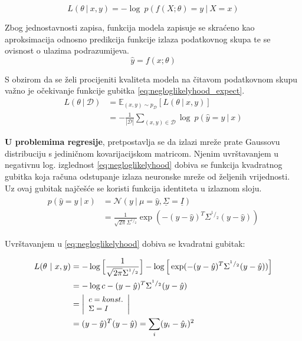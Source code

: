 \documentclass[times, utf8, numeric, diplomski]{fer}
\def\mat#1{\underline{#1}}
\def\expect{\mathbb{E}}
\def\normal{\mathcal{N}}
\def\probsep{\ |\ }
\def\dataset{\mathcal{D}}
\begin{document}
\begin{equation}
\label{eq:negloglikelyhood}
L(\theta \probsep x,y) = -\log\ p(f(X;\theta)=y \probsep X=x)
\end{equation}

Zbog jednostavnosti zapisa, funkcija modela zapisuje se skraćeno kao aproksimacija odnosno predikcija funkcije izlaza podatkovnog skupa te se ovisnost o ulazima podrazumijeva.
\begin{equation}
\hat{y} = f(x; \theta)
\end{equation}

S obzirom da se želi procijeniti kvaliteta modela na čitavom podatkovnom skupu važno je očekivanje funkcije gubitka \eqref{eq:negloglikelyhood_expect}.
\begin{equation}
\label{eq:negloglikelyhood_expect}
\begin{split}
L(\theta \probsep \dataset) &= \expect_{(x,y) \sim p_\dataset}[L(\theta \probsep x,y)] \\
&= -\frac{1}{|\dataset|} \sum_{(x,y)\in\dataset} \log\ p(\hat{y}=y \probsep x)
\end{split}
\end{equation}

\textbf{U problemima regresije}, pretpostavlja se da izlazi mreže prate Gaussovu distribuciju s jediničnom kovarijacijskom matricom. Njenim uvrštavanjem u negativnu log. izglednost \eqref{eq:negloglikelyhood} dobiva se funkcija kvadratnog gubitka koja računa odstupanje izlaza neuronske mreže od željenih vrijednosti. Uz ovaj gubitak najčešće se koristi funkcija identiteta u izlaznom sloju.
\begin{align}
\label{eq:normal_dist}
\begin{split}
p(\hat{y}=y \probsep x) &= \normal(y \probsep \mu=\hat{y}, \mat{\Sigma}=\mat{I}) \\
&= \frac{1}{\sqrt{2\pi}\Sigma^{^1/_2}} \exp(-(y-\hat{y})^T\Sigma^{^1/_2}(y-\hat{y}))
\end{split}
\end{align}

Uvrštavanjem u \eqref{eq:negloglikelyhood} dobiva se kvadratni gubitak:

\begin{align}
\label{eq:loss_regression}
L(\theta \probsep x,y) &= - \log \Big[ \frac{1}{\sqrt{2\pi}\Sigma^{^1/_2}} \Big] - \log \Big[ \exp(-(y-\hat{y})^T\Sigma^{^1/_2}(y-\hat{y})) \Big] \nonumber \\
&= -\log c - (y-\hat{y})^T\Sigma^{^1/_2}(y-\hat{y}) \nonumber \\
&= \left|\footnotesize 
\begin{array}[c]{l} 
	c = konst. \\ 
	\Sigma = I 
\end{array}
\right| \nonumber \\
&= (y-\hat{y})^T(y-\hat{y}) = \sum_i (y_i - \hat{y}_i)^2
\end{align}
\end{document}
